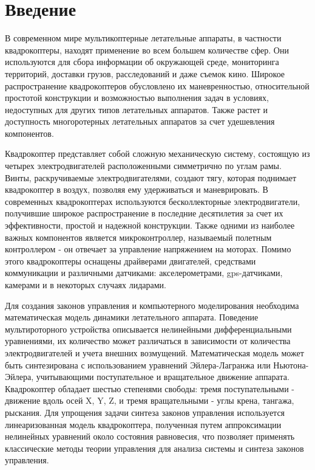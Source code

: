 \chapter*{Введение}
\label{ch:chap1}



В современном мире мультикоптерные летательные аппараты, 
в частности квадрокоптеры, находят применение во всем большем количестве 
сфер. Они используются для сбора информации об окружающей 
среде, мониторинга территорий, доставки грузов, расследований
и даже съемок кино. 
Широкое распространение квадрокоптеров обусловлено 
их маневренностью, относительной простотой конструкции и 
возможностью выполнения задач в условиях, недоступных 
для других типов летательных аппаратов. Также растет и доступность многоротерных 
летательных аппаратов за счет удешевления компонентов.

Квадрокоптер представляет собой сложную механическую систему, состоящую из 
четырех электродвигателей расположенными симметрично по углам рамы. 
Винты, раскручиваемые электродвигателями, создают тягу, которая поднимает квадрокоптер в воздух, 
позволяя ему удерживаться и маневрировать. В современных квадрокоптерах 
используются бесколлекторные электродвигатели, получившие широкое 
распространение в последние десятилетия за счет их эффективности, 
простой и надежной конструкции. Также одними из наиболее важных 
компонентов является микроконтроллер, называемый полетным контроллером - 
он отвечает за управление напряжением на моторах. Помимо этого квадрокоптеры 
оснащены драйверами двигателей, средствами коммуникации и различными датчиками: 
акселерометрами, gps-датчиками, камерами и в некоторых случаях лидарами.

Для создания законов управления и компьютерного моделирования необходима 
математическая модель динамики летательного аппарата. Поведение мультироторного 
устройства описывается нелинейными дифференциальными уравнениями, их 
количество может различаться в зависимости от количества электродвигателей 
и учета внешних возмущений. Математическая модель может быть синтезирована 
с использованием 
уравнений Эйлера-Лагранжа или Ньютона-Эйлера, учитывающими поступательное и 
вращательное движение аппарата.  Квадрокоптер обладает шестью степенями свободы:
тремя поступательными - движение вдоль осей X, Y, Z, и тремя вращательными - углы крена, тангажа, рыскания.
Для упрощения задачи синтеза законов управления  используется 
линеаризованная модель квадрокоптера, полученная путем аппроксимации 
нелинейных уравнений около состояния равновесия, что позволяет применять 
классические методы теории управления для анализа системы и синтеза законов управления.


